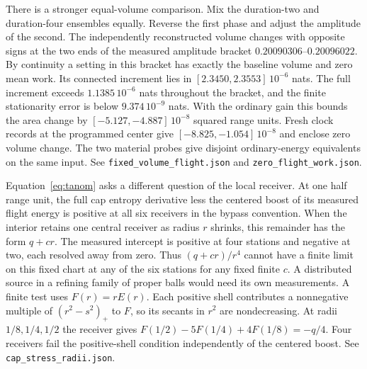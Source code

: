 \documentclass[11pt]{article}
\begin{document}
There is a stronger equal-volume comparison. Mix the duration-two and
duration-four ensembles equally. Reverse the first phase and adjust the
amplitude of the second. The independently reconstructed volume changes
with opposite signs at the two ends of the measured amplitude bracket
\(0.20090306\)--\(0.20096022\). By continuity a setting in this bracket
has exactly the baseline volume and zero mean work. Its connected
increment lies in \([2.3450,2.3553]\,10^{-6}\) nats. The full increment
exceeds \(1.1385\,10^{-6}\) nats throughout the bracket, and the finite
stationarity error is below \(9.374\,10^{-9}\) nats. With the ordinary
gain this bounds the area change by \([-5.127,-4.887]\,10^{-8}\)
squared range units. Fresh clock records at the programmed center give
\([-8.825,-1.054]\,10^{-8}\) and enclose zero volume change. The two
material probes give disjoint ordinary-energy equivalents on the same
input. See \texttt{fixed\_volume\_flight.json} and
\texttt{zero\_flight\_work.json}.

Equation~\eqref{eq:tanom} asks a different question of the local
receiver. At one half range unit, the full cap entropy derivative
less the centered boost of its measured flight energy is positive at
all six receivers in the bypass convention. When the interior retains
one central receiver as radius \(r\) shrinks, this remainder has
the form \(q+c r\). The measured intercept is positive at four
stations and negative at two, each resolved away from zero. Thus
\((q+c r)/r^4\) cannot have a finite limit on this fixed chart at
any of the six stations for any fixed finite \(c\). A distributed
source in a refining family of proper balls would need its own
measurements. A finite test uses \(F(r)=rE(r)\). Each positive shell
contributes a nonnegative multiple of \((r^2-s^2)_+\) to \(F\), so its
secants in \(r^2\) are nondecreasing. At radii \(1/8,1/4,1/2\) the
receiver gives \(F(1/2)-5F(1/4)+4F(1/8)=-q/4\). Four receivers fail
the positive-shell condition independently of the centered boost.
See \texttt{cap\_stress\_radii.json}.
\end{document}
